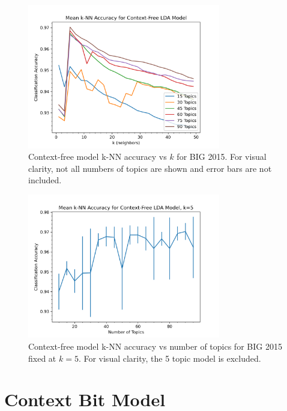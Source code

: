 \documentclass[../stegner_thesis.tex]{subfiles}
\begin{document}
\begin{figure}[p]
	\centering
	\includegraphics[width=0.75\textwidth]{img/msoft_big/knn_lda.png}
	\caption[Context-free model k-NN accuracy vs number of topics for BIG 2015]{%
		Context-free model k-NN accuracy vs $k$ for BIG 2015.
		For visual clarity, not all numbers of topics are shown and error bars are
		not included.
	}%
	\label{fig:msoft_big_knn_topics}
\end{figure}
\begin{figure}[p]
	\centering
	\includegraphics[width=0.75\textwidth]{img/msoft_big/knn_lda_k_05.png}
	\caption[Context-free model k-NN accuracy vs number of topics for BIG 2015]{%
		Context-free model k-NN accuracy vs number of topics for BIG 2015 fixed at
		$k=5$.
		For visual clarity, the 5 topic model is excluded.
	}%
	\label{fig:msoft_big_knn_k5}
\end{figure}

\section{Context Bit Model}%
\label{sec:res_context_bit}
\end{document}
